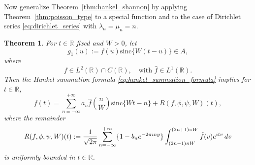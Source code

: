 \documentclass{article}
\newcommand{\assign}{:=}
\newtheorem{theorem}{Theorem}
\begin{document}
Now generalize Theorem~\ref{thm:hankel_shannon} by applying
Theorem~\ref{thm:poisson_type} to a special function and to the case of
Dirichlet series \eqref{eq:dirichlet_series} with $\lambda_n = \mu_n = n$.

\begin{theorem}
  \label{thm:riemann_hankel}For $t \in \mathbb{R}$ fixed and $W > 0$, let
  \begin{equation}
    g_1 (u) \assign f (u) \mathrm{sinc} \{W (t - u)\} \in A,
    \label{eq:riemann_hankel_setup}
  \end{equation}
  where
  \begin{equation}
    f \in L^2 (\mathbb{R}) \cap C (\mathbb{R}), \quad \text{with } \hat{f} \in
    L^1 (\mathbb{R}) . \label{eq:riemann_hankel_condition}
  \end{equation}
  Then the Hankel summation formula \eqref{eq:hankel_summation_formula}
  implies for $t \in \mathbb{R}$,
  \begin{equation}
    f (t) = \sum_{n = - \infty}^{+ \infty} a_n  \hat{f} \left( \frac{n}{W}
    \right) \mathrm{sinc} \{Wt - n\} + R (f, \phi, \psi, W) (t),
    \label{eq:riemann_hankel_result}
  \end{equation}
  where the remainder
  \begin{equation}
    R (f, \phi, \psi, W) (t) \assign \frac{1}{\sqrt{2 \pi}}  \sum_{n = -
    \infty}^{+ \infty} \{ 1 - b_n e^{- 2 \pi iny} \}  \int_{(2 n - 1) \pi
    W}^{(2 n + 1) \pi W} \hat{f} (v) e^{itv}  \hspace{0.17em} dv
    \label{eq:remainder_formula}
  \end{equation}
  is uniformly bounded in $t \in \mathbb{R}$.
\end{theorem}
\end{document}
